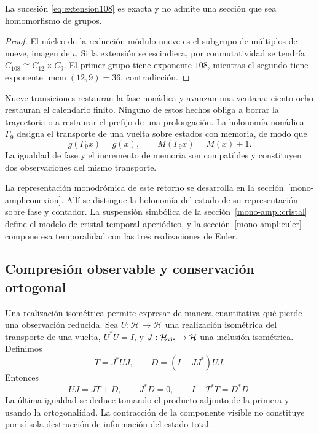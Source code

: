 \begin{proposition}
La sucesión \eqref{eq:extension108} es exacta y no admite una sección que sea homomorfismo de grupos.
\end{proposition}
\begin{proof}
El núcleo de la reducción módulo nueve es el subgrupo de múltiplos de nueve, imagen de \(\iota\). Si la extensión se escindiera, por conmutatividad se tendría \(C_{108}\cong C_{12}\times C_9\). El primer grupo tiene exponente \(108\), mientras el segundo tiene exponente \(\operatorname{mcm}(12,9)=36\), contradicción.
\end{proof}

Nueve transiciones restauran la fase nonádica y avanzan una ventana; ciento ocho restauran el calendario finito. Ninguno de estos hechos obliga a borrar la trayectoria o a restaurar el prefijo de una prolongación. La holonomía nonádica \(\Gamma_9\) designa el transporte de una vuelta sobre estados con memoria, de modo que
\begin{equation}
 g(\Gamma_9x)=g(x),\qquad M(\Gamma_9x)=M(x)+1.
 \label{eq:holonomia-memoria}
\end{equation}
La igualdad de fase y el incremento de memoria son compatibles y constituyen dos observaciones del mismo transporte.



La representación monodrómica de este retorno se desarrolla en la
sección~\ref{mono-ampl:conexion}. Allí se distingue la holonomía del
estado de su representación sobre fase y contador. La suspensión
simbólica de la sección~\ref{mono-ampl:cristal} define el modelo de
cristal temporal aperiódico, y la sección~\ref{mono-ampl:euler}
compone esa temporalidad con las tres realizaciones de Euler.

\subsection{Compresión observable y conservación ortogonal}

Una realización isométrica permite expresar de manera cuantitativa qué pierde una observación reducida. Sea \(U:\mathcal H\to\mathcal H\) una realización isométrica del transporte de una vuelta, \(U^*U=I\), y \(J:\mathcal H_{\rm vis}\to\mathcal H\) una inclusión isométrica. Definimos
\[
 T=J^*UJ,\qquad D=(I-JJ^*)UJ.
\]
Entonces
\begin{equation}
 UJ=JT+D,\qquad J^*D=0,\qquad I-T^*T=D^*D.
 \label{eq:conservacion-ortogonal}
\end{equation}
La última igualdad se deduce tomando el producto adjunto de la primera y usando la ortogonalidad. La contracción de la componente visible no constituye por sí sola destrucción de información del estado total.

